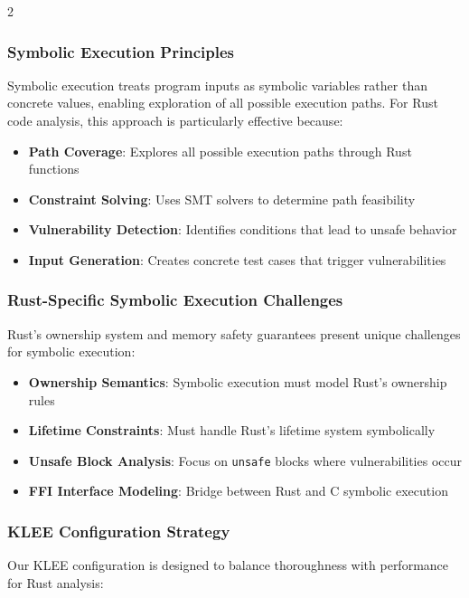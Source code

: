 \documentclass[12pt,a4paper]{article}
\begin{document}
\begin{multicols}{2}
\subsubsection{Symbolic Execution Principles}

Symbolic execution treats program inputs as symbolic variables rather than concrete values, enabling exploration of all possible execution paths. For Rust code analysis, this approach is particularly effective because:

\begin{itemize}
    \item \textbf{Path Coverage}: Explores all possible execution paths through Rust functions
    \item \textbf{Constraint Solving}: Uses SMT solvers to determine path feasibility
    \item \textbf{Vulnerability Detection}: Identifies conditions that lead to unsafe behavior
    \item \textbf{Input Generation}: Creates concrete test cases that trigger vulnerabilities
\end{itemize}

\subsubsection{Rust-Specific Symbolic Execution Challenges}

Rust's ownership system and memory safety guarantees present unique challenges for symbolic execution:

\begin{itemize}
    \item \textbf{Ownership Semantics}: Symbolic execution must model Rust's ownership rules
    \item \textbf{Lifetime Constraints}: Must handle Rust's lifetime system symbolically
    \item \textbf{Unsafe Block Analysis}: Focus on \texttt{unsafe} blocks where vulnerabilities occur
    \item \textbf{FFI Interface Modeling}: Bridge between Rust and C symbolic execution
\end{itemize}

\subsubsection{KLEE Configuration Strategy}

Our KLEE configuration is designed to balance thoroughness with performance for Rust analysis:


\end{multicols}
\end{document}
